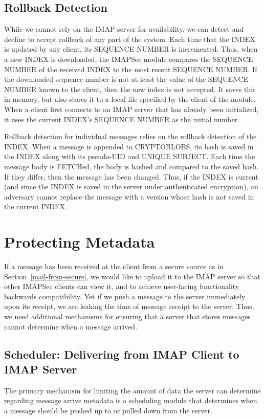 \documentclass[pageno]{jpaper}
\newcommand{\project}{IMAPSec }
\begin{document}
\label{rollback}
\subsection{Rollback Detection}
While we cannot rely on the IMAP server for availability, we can detect and decline to accept rollback of any part of the system. Each time that the INDEX is updated by any client, its SEQUENCE NUMBER is incremented. Thus, when a new INDEX is downloaded, the \project module compares the SEQUENCE NUMBER of the received INDEX to the most recent SEQUENCE NUMBER. If the downloaded sequence number is not at least the value of the SEQUENCE NUMBER known to the client, then the new index is not accepted. It saves this in memory, but also stores it to a local file specified by the client of the module. When a client first connects to an IMAP server that has already been initialized, it uses the current INDEX's SEQUENCE NUMBER as the initial number.

Rollback detection for individual messages relies on the rollback detection of the INDEX. When a message is appended to CRYPTOBLOBS, its hash is saved in the INDEX along with its pseudo-UID and UNIQUE SUBJECT. Each time the message body is FETCHed, the body is hashed and compared to the saved hash. If they differ, then the message has been changed. Thus, if the INDEX is current (and since the INDEX is saved in the server under authenticated encryption), an adversary cannot replace the message with a version whose hash is not saved in the current INDEX.


\section{Protecting Metadata}

If a message has been received at the client from a secure source as in Section~\ref{mail-from-secure}, we would like to upload it to the IMAP server so that other \project clients can view it, and to achieve user-facing functionality backwards compatibility. Yet if we push a message to the server immediately upon its receipt, we are leaking the time of message receipt to the server. Thus, we need additional mechanisms for ensuring that a server that stores messages cannot determine when a message arrived.

\subsection{Scheduler: Delivering from IMAP Client to IMAP Server}
The primary mechanism for limiting the amount of data the server can determine regarding message arrive metadata is a scheduling module that determines when a message should be pushed up to or pulled down from the server.
\end{document}
